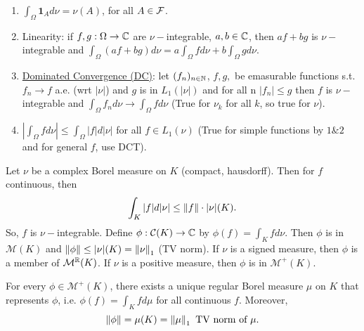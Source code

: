 \documentclass{article}
\begin{document}
\begin{enumerate}
    \item $\int_\Omega\mathbf{1}_A d\nu= \nu(A)$, for all $A\in\mathcal{F}$.
    \item Linearity: if $f,g:\Omega\to\mathbb{C}$ are $\nu-$integrable, $a,b\in\mathbb{C}$, then $af+bg$ is $\nu-$integrable and $\int_\Omega (af+bg)d\nu = a\int_\Omega fd\nu+b\int_\Omega gd\nu$.
    \item \noindent\underline{Dominated Convergence (DC)}: let $(f_n)_{n\in\mathbb{N}}$, $f,g,$ be emasurable functions s.t. $f_n\to f$ a.e. (wrt $|\nu|$) and $g$ is in $L_1(|\nu|)$ and for all n $|f_n|\leq g$ then $f$ is $\nu-$integrable and $\int_\Omega f_n d\nu\to \int_\Omega f d\nu$ (True for $\nu_k$ for all $k$, so true for $\nu$).
    \item $\left|\int_\Omega fd\nu\right|\leq\int_\Omega|f|d|\nu|$ for all $f\in L_1(\nu)$ (True for simple functions by $1\&2$ and for general $f$, use DCT).
\end{enumerate}

Let $\nu$ be a complex Borel measure on $K$ (compact, hausdorff). Then for $f$ continuous, then 
$$
\displaystyle\int_K|f|d|\nu|\leq \left\lVert f\right\rVert\cdot|\nu|(K).
$$
So, $f$ is $\nu-$integrable. Define $\phi:\mathcal{C}(K)\to\mathbb{C}$ by $\phi(f)=\int_K fd\nu$. Then $\phi$ is in $\mathcal{M}(K)$ and $\left\lVert\phi\right\rVert\leq |\nu|(K)=\left\lVert\nu\right\rVert_1$ (TV norm). If $\nu$ is a signed measure, then $\phi$ is a member of $\mathcal{M}^{\mathbb{R}}(K)$. If $\nu$ is a positive measure, then $\phi$ is in $\mathcal{M}^+(K)$.

\begin{theorem}\label{thm: Riesz Representation C(K)}
    For every $\phi\in\mathcal{M}^+(K)$, there exists a unique regular Borel measure $\mu$ on $K$ that represents $\phi$, i.e. $\phi(f) = \int_K fd\mu$ for all continuous $f$. Moreover, 
    $$
    \left\lVert\phi\right\rVert=\mu(K)=\left\lVert\mu\right\rVert_1 \text{ TV norm of } \mu.
    $$
\end{theorem}
\end{document}

